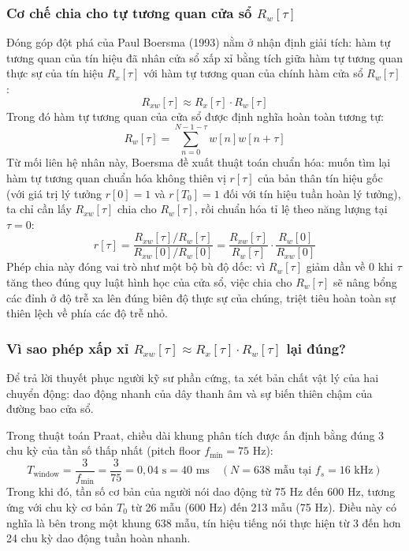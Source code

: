 \subsubsection*{Cơ chế chia cho tự tương quan cửa sổ $R_w[\tau]$}
Đóng góp đột phá của Paul Boersma (1993) nằm ở nhận định giải tích: hàm tự tương quan của tín hiệu đã nhân cửa sổ xấp xỉ bằng tích giữa hàm tự tương quan thực sự của tín hiệu $R_x[\tau]$ với hàm tự tương quan của chính hàm cửa sổ $R_w[\tau]$:
\begin{equation}
R_{xw}[\tau] \approx R_x[\tau] \cdot R_w[\tau]
\end{equation}
Trong đó hàm tự tương quan của cửa sổ được định nghĩa hoàn toàn tương tự:
\begin{equation}
R_w[\tau] = \sum_{n=0}^{N-1-\tau} w[n] w[n+\tau]
\end{equation}
Từ mối liên hệ nhân này, Boersma đề xuất thuật toán chuẩn hóa: muốn tìm lại hàm tự tương quan chuẩn hóa không thiên vị $r[\tau]$ của bản thân tín hiệu gốc (với giá trị lý tưởng $r[0] = 1$ và $r[T_0] = 1$ đối với tín hiệu tuần hoàn lý tưởng), ta chỉ cần lấy $R_{xw}[\tau]$ chia cho $R_w[\tau]$, rồi chuẩn hóa tỉ lệ theo năng lượng tại $\tau = 0$:
\begin{equation}
r[\tau] = \frac{R_{xw}[\tau] / R_w[\tau]}{R_{xw}[0] / R_w[0]} = \frac{R_{xw}[\tau]}{R_w[\tau]} \cdot \frac{R_w[0]}{R_{xw}[0]}
\end{equation}
Phép chia này đóng vai trò như một bộ bù độ dốc: vì $R_w[\tau]$ giảm dần về 0 khi $\tau$ tăng theo đúng quy luật hình học của cửa sổ, việc chia cho $R_w[\tau]$ sẽ nâng bổng các đỉnh ở độ trễ xa lên đúng biên độ thực sự của chúng, triệt tiêu hoàn toàn sự thiên lệch về phía các độ trễ nhỏ.

\subsubsection*{Vì sao phép xấp xỉ $R_{xw}[\tau] \approx R_x[\tau] \cdot R_w[\tau]$ lại đúng?}
Để trả lời thuyết phục người kỹ sư phần cứng, ta xét bản chất vật lý của hai chuyển động: dao động nhanh của dây thanh âm và sự biến thiên chậm của đường bao cửa sổ. 

Trong thuật toán Praat, chiều dài khung phân tích được ấn định bằng đúng 3 chu kỳ của tần số thấp nhất (pitch floor $f_{\min} = 75\text{ Hz}$):
\begin{equation}
T_{\text{window}} = \frac{3}{f_{\min}} = \frac{3}{75} = 0{,}04\text{ s} = 40\text{ ms} \quad (N = 638\text{ mẫu tại } f_s = 16\text{ kHz})
\end{equation}
Trong khi đó, tần số cơ bản của người nói dao động từ 75 Hz đến 600 Hz, tương ứng với chu kỳ cơ bản $T_0$ từ 26 mẫu (600 Hz) đến 213 mẫu (75 Hz). Điều này có nghĩa là bên trong một khung 638 mẫu, tín hiệu tiếng nói thực hiện từ 3 đến hơn 24 chu kỳ dao động tuần hoàn nhanh.

